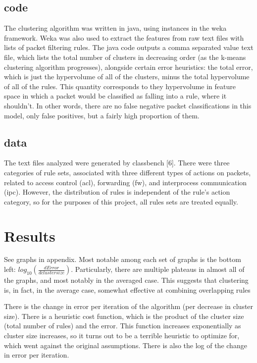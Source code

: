\documentclass[11pt,letterpaper]{article}
\begin{document}
\subsection{code}
The clustering algorithm was written in java, using instances in the weka framework. Weka was also used to extract the features from raw text files with lists of packet filtering rules. The java code outputs a comma separated value text file, which lists the total number of clusters in decreasing order (as the k-means clustering algorithm progresses), alongside certain error heuristics: the total error, which is just the hypervolume of all of the clusters, minus the total hypervolume of all of the rules. This quantity corresponds to they hypervolume in feature space in which a packet would be classified as falling into a rule, where it shouldn't. In other words, there are no false negative packet classifications in this model, only false positives, but a fairly high proportion of them. 
\subsection{data}
The text files analyzed were generated by classbench [6]. There were three categories of rule sets, associated with three different types of actions on packets, related to access control (acl), forwarding (fw), and interprocess communication (ipc). However, the distribution of rules is independent of the rule's action category, so for the purposes of this project, all rules sets are treated equally. 

\section{Results}
See graphs in appendix. Most notable among each set of graphs is the bottom left: $log_{10} (\frac{d Error}{d cluster size})$. Particularly, there are multiple plateaus  in almost all of the graphs, and most notably in the averaged case. This suggests that clustering is, in fact, in the average case, somewhat effective at combining overlapping rules

There is the change in error per iteration of the algorithm (per decrease in cluster size). There is a heuristic cost function, which is the product of the cluster size (total number of rules) and the error. This function increases exponentially as cluster size increases, so it turns out to be a terrible heuristic to optimize for, which went against the original assumptions. There is also the log of the change in error per iteration.
\end{document}
